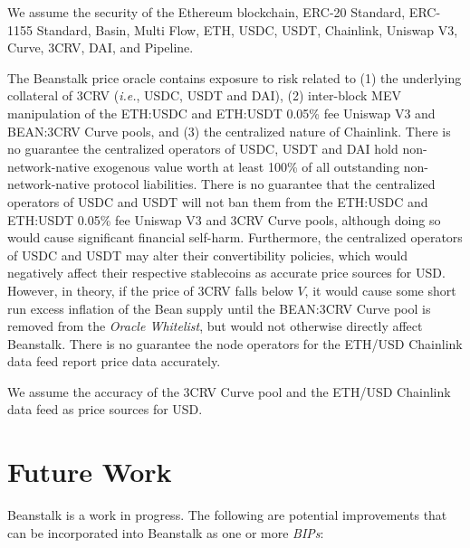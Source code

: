 \documentclass[tikz]{article}
\newcommand{\term}[1]{\textsl{#1}}
\begin{document}
We assume the security of the Ethereum blockchain, ERC-20 Standard, ERC-1155 Standard, Basin, Multi Flow, ETH, USDC, USDT, Chainlink, Uniswap V3, Curve, 3CRV, DAI, and Pipeline.

The Beanstalk price oracle contains exposure to risk related to (1) the underlying collateral of 3CRV (\term{i.e.}, USDC, USDT and DAI), (2) inter-block MEV manipulation of the ETH:USDC and ETH:USDT 0.05\% fee Uniswap V3 and BEAN:3CRV Curve pools, and (3) the centralized nature of Chainlink. There is no guarantee the centralized operators of USDC, USDT and DAI hold non-network-native exogenous value worth at least 100\% of all outstanding non-network-native protocol liabilities. There is no guarantee that the centralized operators of USDC and USDT will not ban them from the ETH:USDC and ETH:USDT 0.05\% fee Uniswap V3 and 3CRV Curve pools, although doing so would cause significant financial self-harm. Furthermore, the centralized operators of USDC and USDT may alter their convertibility policies, which would negatively affect their respective stablecoins as accurate price sources for USD. However, in theory, if the price of 3CRV falls below \hyperlink{ht216}{$V$}, it would cause some short run excess inflation of the Bean supply until the BEAN:3CRV Curve pool is removed from the \term{Oracle Whitelist}, but would not otherwise directly affect Beanstalk. There is no guarantee the node operators for the ETH/USD Chainlink data feed report price data accurately.

We assume the accuracy of the 3CRV Curve pool and the ETH/USD Chainlink data feed as price sources for USD.

\newpage

\section{Future Work}
Beanstalk is a work in progress. The following are potential improvements that can be incorporated into Beanstalk as one or more \term{BIPs}:
\end{document}
